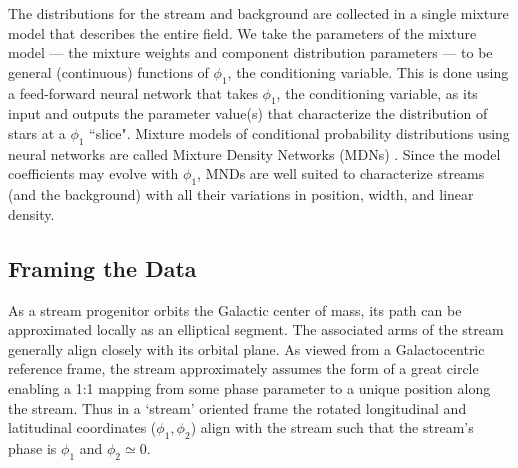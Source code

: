\documentclass[twocolumn, linenumbers]{aastex631}
\begin{document}
    The distributions for the stream and background are collected in a single
    mixture model that describes the entire field.  We take the parameters of
    the mixture model --- the mixture weights and component distribution
    parameters --- to be general (continuous) functions of $\phi_1$, the
    conditioning variable. This is done using a feed-forward neural network that
    takes $\phi_1$, the conditioning variable, as its input and outputs the
    parameter value(s) that characterize the distribution of stars at a $\phi_1$
    ``slice".  Mixture models of conditional probability distributions using
    neural networks are called Mixture Density Networks (MDNs)
    \citep{Bishop+1994}.  Since the model coefficients may evolve with $\phi_1$,
    MNDs are well suited to characterize streams (and the background) with all
    their variations in position, width, and linear density.


    \subsection{Framing the Data} \label{sub:method:framing_the_data}

        As a stream progenitor orbits the Galactic center of mass, its path can
        be approximated locally as an elliptical segment. The associated arms of
        the stream generally align closely with its orbital plane.  As viewed
        from a Galactocentric reference frame, the stream approximately assumes
        the form of a great circle enabling a 1:1 mapping from some phase
        parameter to a unique position along the stream. Thus in a `stream'
        oriented frame the rotated longitudinal and latitudinal coordinates
        ($\phi_1, \phi_2$) align with the stream such that the stream's phase is
        $\phi_1$ and $\phi_2 \simeq 0$.
\end{document}
